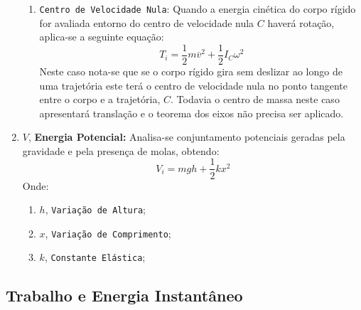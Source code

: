 \documentclass{article}
\begin{document}
\begin{enumerate}[rightmargin = \leftmargin]
\begin{enumerate}[rightmargin = \leftmargin]
                            \item \texttt{Centro de Velocidade Nula}: Quando a energia cinética do corpo rígido for avaliada entorno do centro de velocidade nula $C$ haverá rotação, aplica-se a seguinte equação:
                                \begin{equation}
                                    \boxed{
                                        T_{i} = 
                                        \frac{1}{2}m\overline{v}^{2} + 
                                        \frac{1}{2}I_{C}\omega^{2}
                                    }
                                \end{equation}
                            Neste caso nota-se que se o corpo rígido gira sem deslizar ao longo de uma trajetória este terá o centro de velocidade nula no ponto tangente entre o corpo e a trajetória, $C$. Todavia o centro de massa neste caso apresentará translação e o teorema dos eixos não precisa ser aplicado.
                        \end{enumerate}

                    \item $V$, \textbf{Energia Potencial:} Analisa-se conjuntamento potenciais geradas pela gravidade e pela presença de molas, obtendo:
                        \begin{equation}
                            \boxed{
                                V_{i} = 
                                m g h +
                                \frac{1}{2} k x^{2} 
                            }
                        \end{equation}
                    Onde:
                        \begin{enumerate}[rightmargin = \leftmargin, noitemsep]
                            \item $h$, \texttt{Variação de Altura};
                            \item $x$, \texttt{Variação de Comprimento};
                            \item $k$, \texttt{Constante Elástica};
                        \end{enumerate}
                \end{enumerate}

        \subsection{Trabalho e Energia Instantâneo}
\end{document}
